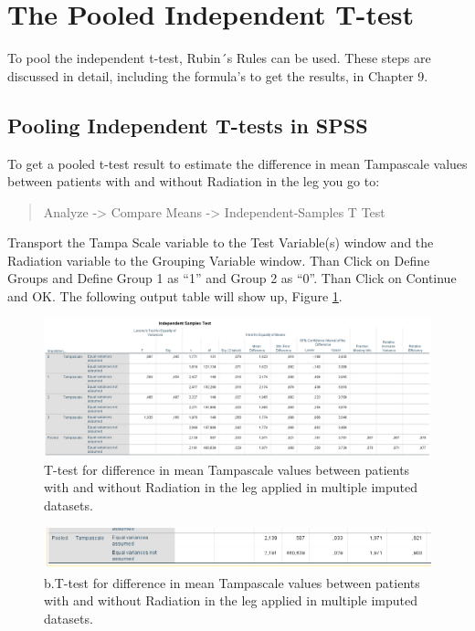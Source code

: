 \documentclass[]{book}
\begin{document}
\section{The Pooled Independent
T-test}\label{the-pooled-independent-t-test}

To pool the independent t-test, Rubin´s Rules can be used. These steps
are discussed in detail, including the formula's to get the results, in
Chapter 9.

\subsection{Pooling Independent T-tests in
SPSS}\label{pooling-independent-t-tests-in-spss}

To get a pooled t-test result to estimate the difference in mean
Tampascale values between patients with and without Radiation in the leg
you go to:

\begin{quote}
Analyze -\textgreater{} Compare Means -\textgreater{}
Independent-Samples T Test
\end{quote}

Transport the Tampa Scale variable to the Test Variable(s) window and
the Radiation variable to the Grouping Variable window. Than Click on
Define Groups and Define Group 1 as ``1'' and Group 2 as ``0''. Than
Click on Continue and OK. The following output table will show up,
Figure \ref{fig:tab5-1a}.

\begin{figure}

{\centering \includegraphics[width=0.9\linewidth]{images/table5.1} 

}

\caption{T-test for difference in mean Tampascale values between patients with and without Radiation in the leg applied in multiple imputed datasets.}\label{fig:tab5-1a}
\end{figure}

\begin{figure}

{\centering \includegraphics[width=0.9\linewidth]{images/table5.1b} 

}

\caption{b.T-test for difference in mean Tampascale values between patients with and without Radiation in the leg applied in multiple imputed datasets.}\label{fig:tab5-1b}
\end{figure}
\end{document}
